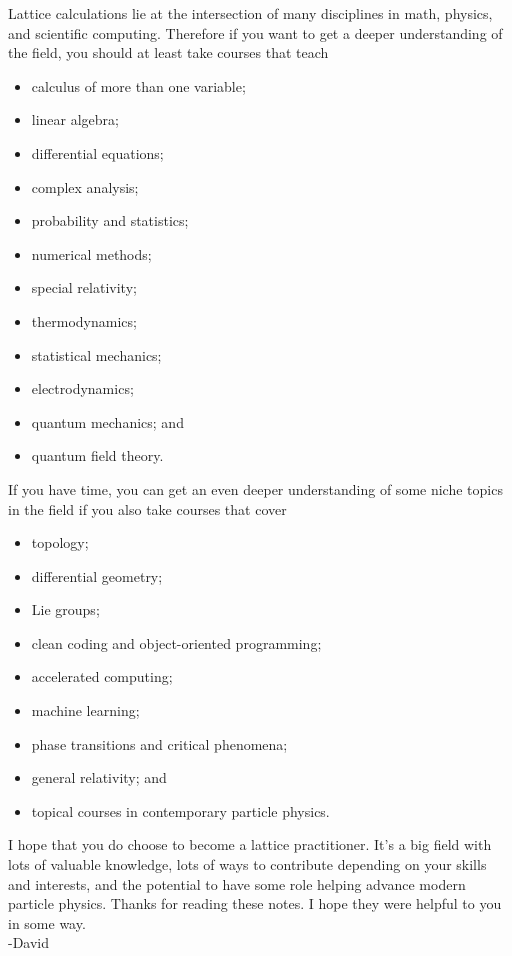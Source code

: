 Lattice calculations lie at the intersection of many disciplines in math,
physics, and scientific computing. Therefore if you want to get a deeper
understanding of the field, you should at least take courses that teach
\begin{itemize}
  \item calculus of more than one variable;
  \item linear algebra;
  \item differential equations;
  \item complex analysis;
  \item probability and statistics;
  \item numerical methods;
  \item special relativity;
  \item thermodynamics;
  \item statistical mechanics;
  \item electrodynamics;
  \item quantum mechanics; and
  \item quantum field theory.
\end{itemize}
If you have time, you can get an even deeper understanding of some niche topics
in the field if you also take courses that cover
\begin{itemize}
  \item topology;
  \item differential geometry;
  \item Lie groups;
  \item clean coding and object-oriented programming;
  \item accelerated computing;
  \item machine learning;
  \item phase transitions and critical phenomena;
  \item general relativity; and
  \item topical courses in contemporary particle physics.
\end{itemize}

I hope that you do choose to become a lattice practitioner. It's a big field
with lots of valuable knowledge, lots of ways to contribute depending on your
skills and interests, and the potential to have some role helping advance modern
particle physics. Thanks for reading these notes. I hope they were helpful to
you in some way.\\[5mm]
-David

